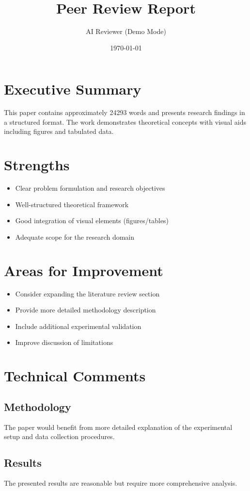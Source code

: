 \documentclass[11pt]{article}
\title{Peer Review Report}
\author{AI Reviewer (Demo Mode)}
\date{\today}
\begin{document}
\maketitle

\section{Executive Summary}
This paper contains approximately 24293 words and presents research findings in a structured format. The work demonstrates theoretical concepts with visual aids including figures and tabulated data.

\section{Strengths}
\begin{itemize}
\item Clear problem formulation and research objectives
\item Well-structured theoretical framework
\item Good integration of visual elements (figures/tables)
\item Adequate scope for the research domain
\end{itemize}

\section{Areas for Improvement}
\begin{itemize}
\item Consider expanding the literature review section
\item Provide more detailed methodology description
\item Include additional experimental validation
\item Improve discussion of limitations
\end{itemize}

\section{Technical Comments}
\subsection{Methodology}
The paper would benefit from more detailed explanation of the experimental setup and data collection procedures.

\subsection{Results}
The presented results are reasonable but require more comprehensive analysis.
\end{document}
